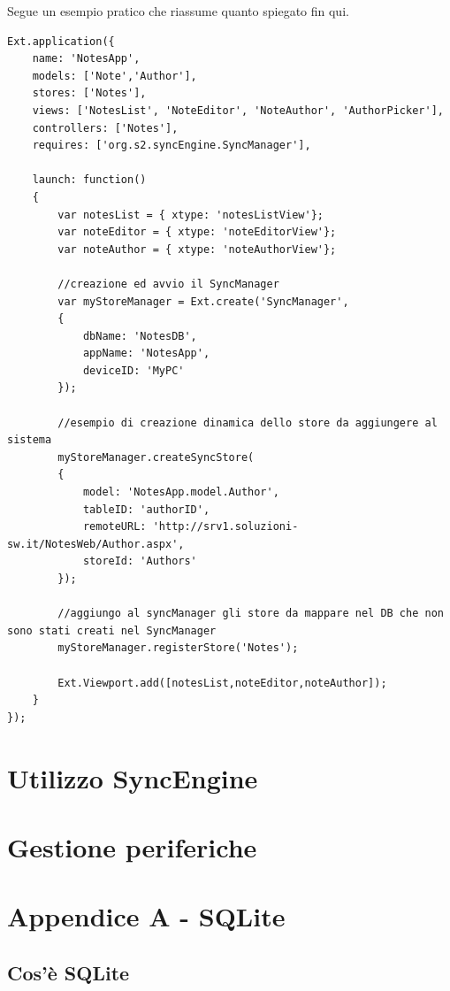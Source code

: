 \documentclass[10pt,a4paper,onecolumn]{article}
\begin{document}
Segue un esempio pratico che riassume quanto spiegato fin qui.

\begin{lstlisting}
Ext.application({
	name: 'NotesApp',
	models: ['Note','Author'],
	stores: ['Notes'],
	views: ['NotesList', 'NoteEditor', 'NoteAuthor', 'AuthorPicker'],
	controllers: ['Notes'],
	requires: ['org.s2.syncEngine.SyncManager'],
	
	launch: function()
	{
		var notesList = { xtype: 'notesListView'};
		var noteEditor = { xtype: 'noteEditorView'};
		var noteAuthor = { xtype: 'noteAuthorView'};
		
		//creazione ed avvio il SyncManager
		var myStoreManager = Ext.create('SyncManager',
		{
			dbName: 'NotesDB',
			appName: 'NotesApp',
			deviceID: 'MyPC'
		});
		
		//esempio di creazione dinamica dello store da aggiungere al sistema
		myStoreManager.createSyncStore(
		{
			model: 'NotesApp.model.Author',
			tableID: 'authorID',
			remoteURL: 'http://srv1.soluzioni-sw.it/NotesWeb/Author.aspx',
			storeId: 'Authors'
		});
		
		//aggiungo al syncManager gli store da mappare nel DB che non sono stati creati nel SyncManager
		myStoreManager.registerStore('Notes');
		
		Ext.Viewport.add([notesList,noteEditor,noteAuthor]);
	}
});
\end{lstlisting}

\clearpage

\section{Utilizzo SyncEngine}


\clearpage

\section{Gestione periferiche}


\clearpage

\section{Appendice A - SQLite}

\subsection{Cos'è SQLite}
\end{document}
